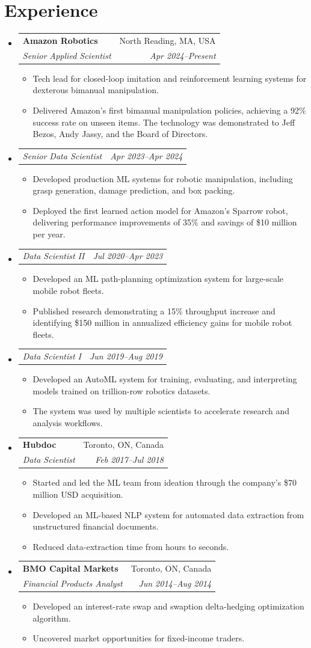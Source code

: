 \documentclass[a4paper,11pt]{article}
\makeatletter
\newcommand{\resumeItem}[1]{
  \item\small{#1}
}
\newcommand{\resumeItemListStart}{
  \begin{itemize}[rightmargin=0.11in, itemsep=1.5pt, topsep=4pt, parsep=0pt, partopsep=0pt]
}
\newcommand{\resumeItemListEnd}{\end{itemize}}
\newcommand{\resumeQuadHeading}[4]{
  \item
  \begin{tabular*}{0.96\textwidth}[t]{l@{\extracolsep{\fill}}r}
    \textbf{#1} & #2 \\
    \textit{\small#3} & \textit{\small #4} \\
  \end{tabular*}
}
\newcommand{\resumeQuadHeadingChild}[2]{
  \item
  \begin{tabular*}{0.96\textwidth}[t]{l@{\extracolsep{\fill}}r}
    \textit{\small#1} & \textit{\small#2} \\
  \end{tabular*}
}
\newcommand{\resumeHeadingListStart}{
  \begin{itemize}[leftmargin=0.15in, label={}]
}
\newcommand{\resumeHeadingListEnd}{\end{itemize}}
\makeatother
\begin{document}
\section{Experience}
\resumeHeadingListStart
  \resumeQuadHeading{Amazon Robotics}{North Reading, MA, USA}{Senior Applied Scientist}{Apr 2024--Present}
    \resumeItemListStart
      \resumeItem{Tech lead for closed-loop imitation and reinforcement learning systems for dexterous bimanual manipulation.}
      \resumeItem{Delivered Amazon's first bimanual manipulation policies, achieving a 92\% success rate on unseen items. The technology was demonstrated to Jeff Bezos, Andy Jassy, and the Board of Directors.}
    \resumeItemListEnd
  \resumeQuadHeadingChild{Senior Data Scientist}{Apr 2023--Apr 2024}
    \resumeItemListStart
      \resumeItem{Developed production ML systems for robotic manipulation, including grasp generation, damage prediction, and box packing.}
      \resumeItem{Deployed the first learned action model for Amazon's Sparrow robot, delivering performance improvements of 35\% and savings of \$10 million per year.}
    \resumeItemListEnd
  \resumeQuadHeadingChild{Data Scientist II}{Jul 2020--Apr 2023}
    \resumeItemListStart
      \resumeItem{Developed an ML path-planning optimization system for large-scale mobile robot fleets.}
      \resumeItem{Published research demonstrating a 15\% throughput increase and identifying \$150 million in annualized efficiency gains for mobile robot fleets.}
    \resumeItemListEnd
  \resumeQuadHeadingChild{Data Scientist I}{Jun 2019--Aug 2019}
    \resumeItemListStart
      \resumeItem{Developed an AutoML system for training, evaluating, and interpreting models trained on trillion-row robotics datasets.}
      \resumeItem{The system was used by multiple scientists to accelerate research and analysis workflows.}
    \resumeItemListEnd
  \resumeQuadHeading{Hubdoc}{Toronto, ON, Canada}{Data Scientist}{Feb 2017--Jul 2018}
    \resumeItemListStart
      \resumeItem{Started and led the ML team from ideation through the company's \$70 million USD acquisition.}
      \resumeItem{Developed an ML-based NLP system for automated data extraction from unstructured financial documents.}
      \resumeItem{Reduced data-extraction time from hours to seconds.}
    \resumeItemListEnd
  \resumeQuadHeading{BMO Capital Markets}{Toronto, ON, Canada}{Financial Products Analyst}{Jun 2014--Aug 2014}
    \resumeItemListStart
      \resumeItem{Developed an interest-rate swap and swaption delta-hedging optimization algorithm.}
      \resumeItem{Uncovered market opportunities for fixed-income traders.}
    \resumeItemListEnd
\resumeHeadingListEnd
\end{document}
